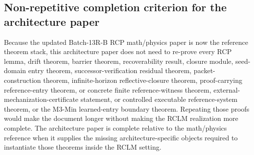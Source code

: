 \documentclass[11pt,a4paper]{article}
\begin{document}
\subsection{Non-repetitive completion criterion for the architecture paper}

Because the updated Batch-13R-B RCP math/physics paper is now the reference theorem stack, this architecture paper does not need to re-prove every RCP lemma, drift theorem, barrier theorem, recoverability result, closure module, seed-domain entry theorem, successor-verification residual theorem, packet-construction theorem, infinite-horizon reflective-closure theorem, proof-carrying reference-entry theorem, or concrete finite reference-witness theorem, external-mechanization-certificate statement, or controlled executable reference-system theorem, or the M3-Min learned-entry boundary theorem. Repeating those proofs would make the document longer without making the RCLM realization more complete. The architecture paper is complete relative to the math/physics reference when it supplies the missing architecture-specific objects required to instantiate those theorems inside the RCLM setting.
\end{document}
